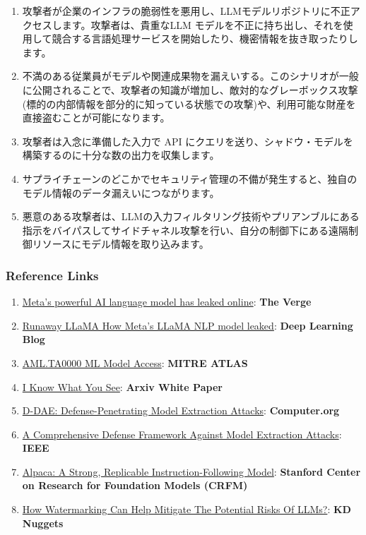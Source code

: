 \documentclass[
]{article}
\providecommand{\tightlist}{%
  \setlength{\itemsep}{0pt}\setlength{\parskip}{0pt}}
\begin{document}
\begin{enumerate}
\def\labelenumi{\arabic{enumi}.}
\tightlist
\item
  攻撃者が企業のインフラの脆弱性を悪用し、LLMモデルリポジトリに不正アクセスします。攻撃者は、貴重なLLM
  モデルを不正に持ち出し、それを使用して競合する言語処理サービスを開始したり、機密情報を抜き取ったりします。
\item
  不満のある従業員がモデルや関連成果物を漏えいする。このシナリオが一般に公開されることで、攻撃者の知識が増加し、敵対的なグレーボックス攻撃(標的の内部情報を部分的に知っている状態での攻撃)や、利用可能な財産を直接盗むことが可能になります。
\item
  攻撃者は入念に準備した入力で API
  にクエリを送り、シャドウ・モデルを構築するのに十分な数の出力を収集します。
\item
  サプライチェーンのどこかでセキュリティ管理の不備が発生すると、独自のモデル情報のデータ漏えいにつながります。
\item
  悪意のある攻撃者は、LLMの入力フィルタリング技術やプリアンブルにある指示をバイパスしてサイドチャネル攻撃を行い、自分の制御下にある遠隔制御リソースにモデル情報を取り込みます。
\end{enumerate}

\subsubsection{Reference Links}\label{reference-links}

\begin{enumerate}
\def\labelenumi{\arabic{enumi}.}
\tightlist
\item
  \href{https://www.theverge.com/2023/3/8/23629362/meta-ai-language-model-llama-leak-online-misuse}{Meta's
  powerful AI language model has leaked online}: \textbf{The Verge}
\item
  \href{https://www.deeplearning.ai/the-batch/how-metas-llama-nlp-model-leaked/}{Runaway
  LLaMA \textbar{} How Meta's LLaMA NLP model leaked}: \textbf{Deep
  Learning Blog}
\item
  \href{https://atlas.mitre.org/tactics/AML.TA0000}{AML.TA0000 ML Model
  Access}: \textbf{MITRE ATLAS}
\item
  \href{https://arxiv.org/pdf/1803.05847.pdf}{I Know What You See}:
  \textbf{Arxiv White Paper}
\item
  \href{https://www.computer.org/csdl/proceedings-article/sp/2023/933600a432/1He7YbsiH4c}{D-DAE:
  Defense-Penetrating Model Extraction Attacks}: \textbf{Computer.org}
\item
  \href{https://ieeexplore.ieee.org/document/10080996}{A Comprehensive
  Defense Framework Against Model Extraction Attacks}: \textbf{IEEE}
\item
  \href{https://crfm.stanford.edu/2023/03/13/alpaca.html}{Alpaca: A
  Strong, Replicable Instruction-Following Model}: \textbf{Stanford
  Center on Research for Foundation Models (CRFM)}
\item
  \href{https://www.kdnuggets.com/2023/03/watermarking-help-mitigate-potential-risks-llms.html}{How
  Watermarking Can Help Mitigate The Potential Risks Of LLMs?}:
  \textbf{KD Nuggets}
\end{enumerate}
\end{document}
